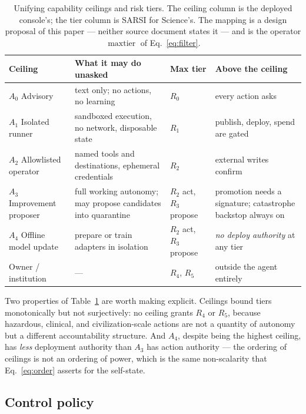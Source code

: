 \documentclass[11pt]{article}
\newcommand{\op}[1]{\operatorname{#1}}
\begin{document}
\begin{table}[t]
\centering\small
\caption{Unifying capability ceilings and risk tiers. The ceiling column is the deployed console's; the tier column is SARSI for Science's. The mapping is a design proposal of this paper --- neither source document states it --- and is the operator $\op{maxtier}$ of Eq.~\eqref{eq:filter}.}
\label{tab:ceilings}
\begin{tabular}{p{2.4cm} p{5.0cm} p{2.4cm} p{5.2cm}}
\toprule
\textbf{Ceiling} & \textbf{What it may do unasked} & \textbf{Max tier} & \textbf{Above the ceiling} \\
\midrule
$A_0$ Advisory & text only; no actions, no learning & $R_0$ & every action asks \\
$A_1$ Isolated runner & sandboxed execution, no network, disposable state & $R_1$ & publish, deploy, spend are gated \\
$A_2$ Allowlisted operator & named tools and destinations, ephemeral credentials & $R_2$ & external writes confirm \\
$A_3$ Improvement proposer & full working autonomy; may propose candidates into quarantine & $R_2$ act, $R_3$ propose & promotion needs a signature; catastrophe backstop always on \\
$A_4$ Offline model update & prepare or train adapters in isolation & $R_2$ act, $R_3$ propose & \emph{no deploy authority} at any tier \\
Owner / institution & --- & $R_4$, $R_5$ & outside the agent entirely \\
\bottomrule
\end{tabular}
\end{table}

Two properties of Table~\ref{tab:ceilings} are worth making explicit. Ceilings bound tiers monotonically but not surjectively: no ceiling grants $R_4$ or $R_5$, because hazardous, clinical, and civilization-scale actions are not a quantity of autonomy but a different accountability structure. And $A_4$, despite being the highest ceiling, has \emph{less} deployment authority than $A_3$ has action authority --- the ordering of ceilings is not an ordering of power, which is the same non-scalarity that Eq.~\eqref{eq:order} asserts for the self-state.

\subsection{Control policy}
\end{document}
